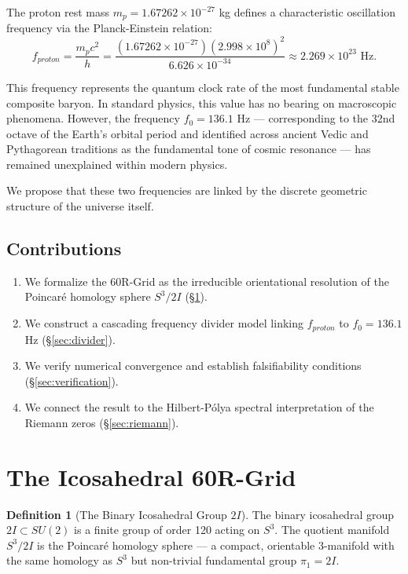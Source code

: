 \documentclass[12pt, a4paper]{article}
\theoremstyle{plain}
\theoremstyle{definition}
\newtheorem{definition}[theorem]{Definition}
\theoremstyle{remark}
\begin{document}
The proton rest mass $m_p = 1.67262 \times 10^{-27}$ kg defines a characteristic oscillation frequency via the Planck-Einstein relation:
\begin{equation}\label{eq:compton_freq}
    f_{proton} = \frac{m_p c^2}{h} = \frac{(1.67262 \times 10^{-27})(2.998 \times 10^8)^2}{6.626 \times 10^{-34}} \approx 2.269 \times 10^{23} \text{ Hz}.
\end{equation}

This frequency represents the quantum clock rate of the most fundamental stable composite baryon. In standard physics, this value has no bearing on macroscopic phenomena. However, the frequency $f_0 = 136.1$ Hz --- corresponding to the 32nd octave of the Earth's orbital period \citep{Cousto1978} and identified across ancient Vedic and Pythagorean traditions as the fundamental tone of cosmic resonance --- has remained unexplained within modern physics.

We propose that these two frequencies are linked by the discrete geometric structure of the universe itself.

\subsection{Contributions}
\begin{enumerate}
    \item We formalize the 60R-Grid as the irreducible orientational resolution of the Poincar\'{e} homology sphere $S^3/2I$ (\S\ref{sec:grid}).
    \item We construct a cascading frequency divider model linking $f_{proton}$ to $f_0 = 136.1$ Hz (\S\ref{sec:divider}).
    \item We verify numerical convergence and establish falsifiability conditions (\S\ref{sec:verification}).
    \item We connect the result to the Hilbert-P\'{o}lya spectral interpretation of the Riemann zeros (\S\ref{sec:riemann}).
\end{enumerate}

\section{The Icosahedral 60R-Grid}\label{sec:grid}

\begin{definition}[The Binary Icosahedral Group $2I$]
The binary icosahedral group $2I \subset SU(2)$ is a finite group of order 120 acting on $S^3$. The quotient manifold $S^3 / 2I$ is the Poincar\'{e} homology sphere --- a compact, orientable 3-manifold with the same homology as $S^3$ but non-trivial fundamental group $\pi_1 = 2I$.
\end{definition}
\end{document}
